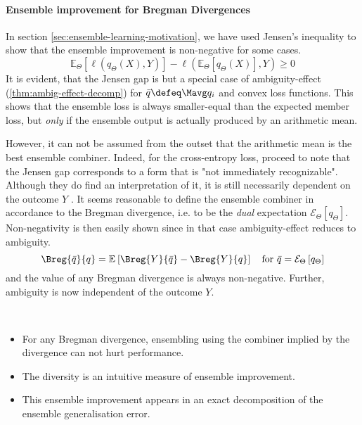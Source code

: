 \documentclass[../main.tex]{subfiles}
\begin{document}
\paragraph{Ensemble improvement for Bregman Divergences}

In section \ref{sec:ensemble-learning-motivation}, we have used Jensen's inequality to show that the ensemble improvement is non-negative for some cases.
$$
\mathbb{E}_{{\Theta}}\left[ \ell (q_{\Theta}(X),Y) \right]  -
\ell(\mathbb{E}_{\Theta}\left[ q_{\Theta}(X) \right] ,Y ) \geq 0
$$
It is evident, that the Jensen gap is but a special case of ambiguity-effect (\ref{thm:ambig-effect-decomp}) for $\bar{q} \defeq \Mavg q_{i}$ and convex loss functions. 
This shows that the ensemble loss is always smaller-equal than the expected member loss, but \textit{only} if the ensemble output is actually produced by an arithmetic mean. 

However, it can not be assumed from the outset that the arithmetic mean is the best ensemble combiner. Indeed, for the cross-entropy loss, \citeauthor{abe_PathologiesPredictiveDiversity_2023} \cite{abe_PathologiesPredictiveDiversity_2023} proceed to note that the Jensen gap corresponds to a form that is "not immediately recognizable". Although they do find an interpretation of it, it is still necessarily dependent on the outcome $Y$ 
.
It seems reasonable to define the ensemble combiner in accordance to the Bregman divergence, i.e. to be the \textit{dual} expectation $\mathcal{E}_{\Theta}\left[ q_{\Theta} \right]$. 
Non-negativity is then easily shown since in that case ambiguity-effect reduces to ambiguity.
$$
\Breg{\bar{q}}{q} = \mathbb{E}_{}\left[ \Breg{Y}{\bar{q}} - \Breg{Y}{q} \right]
\hspace{1em} \text{for $\bar{q} = \mathcal{E}_\Theta\left[q_\Theta\right]$}
$$ and the value of any Bregman divergence is always non-negative. Further, ambiguity is now independent of the outcome $Y$.

\begin{corollary} ~ ~ 
    \label{cor:bregman-divergences}
    \begin{itemize}
        \item For any Bregman divergence, ensembling using the combiner implied by the divergence can not hurt performance.
        \item The diversity is an intuitive measure of ensemble improvement.
        \item This ensemble improvement appears in an exact decomposition of the ensemble generalisation error.
    \end{itemize}
\end{corollary}


\end{document}
